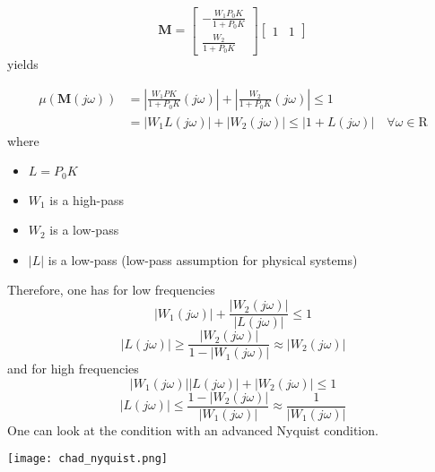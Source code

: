 
\begin{equation*}
    \mathbf{M}=\begin{bmatrix}
        -\frac{W_1P_0K}{1+P_0K} \\
        \frac{W_2}{1+P_0K}
    \end{bmatrix}
    \begin{bmatrix}
        1 & 1
    \end{bmatrix}
\end{equation*}
yields

\begin{align*}
    \mu(\mathbf{M}(j\omega)) & =\left|\frac{W_1PK}{1+P_0K}(j\omega)\right|+\left|\frac{W_2}{1+P_0K}(j\omega)\right|\leq1 \\
                             & =|W_1L(j\omega)|+|W_2(j\omega)|\leq|1+L(j\omega)|\quad\forall\omega\in\mathrm{R}
\end{align*}
where
\begin{itemize}
    \item $L=P_0K$
    \item $W_1$ is a high-pass
    \item $W_2$ is a low-pass
    \item $|L|$ is a low-pass (low-pass assumption for physical systems)
\end{itemize}
Therefore, one has for low frequencies
\begin{equation*}
    |W_1(j\omega)|+\frac{|W_2(j\omega)|}{|L(j\omega)|}\leq1
\end{equation*}
\begin{equation*}
    |L(j\omega)|\geq\frac{|W_2(j\omega)|}{1-|W_1(j\omega)|}\approx|W_2(j\omega)|
\end{equation*}
and for high frequencies
\begin{equation*}
    |W_1(j\omega)||L(j\omega)|+|W_2(j\omega)|\leq1
\end{equation*}
\begin{equation*}
    |L(j\omega)|\leq\frac{1-|W_2(j\omega)|}{|W_1(j\omega)|}\approx\frac1{|W_1(j\omega)|}
\end{equation*}
One can look at the condition with an advanced Nyquist condition.
\begin{center}
    \texttt{[image: chad\_nyquist.png]}
\end{center}

